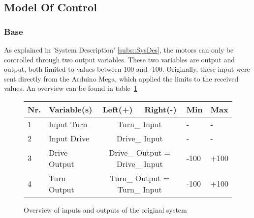 \subsection{Model Of Control}
\subsubsection{Base}
As explained in 'System Description' \ref{subs::SysDes}, the motors can only be controlled through two output variables.
These two variables are  output and  output, both limited to values between 100 and -100.
Originally, these input were sent directly from the Arduino Mega, which applied the limits to the received values.
An overview can be found in table~\ref{tab::varoverview}
\begin{figure}[H]
\begin{tabular}{|l|l|c|c|l|l|}
\hline
\textbf{Nr.} & \textbf{Variable(s)} & \textbf{Left(+)} & \textbf{Right(-)} & \textbf{Min} & \textbf{Max} \\ \hline
1 & Input Turn 	& \multicolumn{2}{c|}{Turn\_ Input} 				& - 		& -		\\ \hline
2 & Input Drive 	& \multicolumn{2}{c|}{Drive\_ Input} 				& - 		& - 		\\ \hline
3 & Drive Output & \multicolumn{2}{c|}{Drive\_ Output = Drive\_ Input}	& -100 	& +100 	\\ \hline
4 & Turn Output 	& \multicolumn{2}{c|}{Turn\_ Output = Turn\_ Input}	& -100	& +100	\\ \hline
\end{tabular}
\caption{Overview of inputs and outputs of the original system}
\label{tab::varoverview}
\end{figure}

